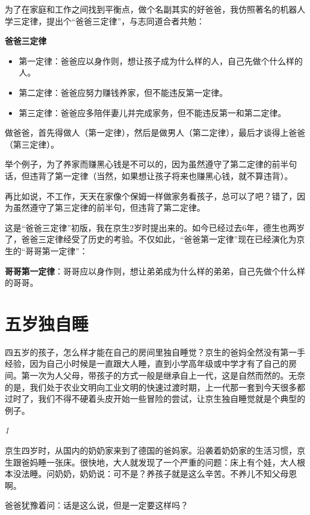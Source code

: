 \documentclass[twoside,openright,headings=optiontohead]{ctexbook} %
\begin{document}
{为了在家庭和工作之间找到平衡点，做个名副其实的好爸爸，我仿照著名的机器人学三定律，提出个``爸爸三定律''，与志同道合者共勉：

\textbf{爸爸三定律}

\begin{itemize}
\item
  第一定律：爸爸应以身作则，想让孩子成为什么样的人，自己先做个什么样的人。
\item
  第二定律：爸爸应努力赚钱养家，但不能违反第一定律。
\item
  第三定律：爸爸应多陪伴妻儿并完成家务，但不能违反第一和第二定律。
\end{itemize}

做爸爸，首先得做人（第一定律），然后是做男人（第二定律），最后才谈得上爸爸（第三定律）。

举个例子，为了养家而赚黑心钱是不可以的，因为虽然遵守了第二定律的前半句话，但违背了第一定律（当然，如果想让孩子将来也赚黑心钱，就不算违背）。

再比如说，不工作，天天在家像个保姆一样做家务看孩子，总可以了吧？错了，因为虽然遵守了第三定律的前半句，但违背了第二定律。

这是``爸爸三定律''初版，我在京生2岁时提出来的。如今已经过去6年，德生也两岁了，爸爸三定律经受了历史的考验。不仅如此，``爸爸第一定律''现在已经演化为京生的``哥哥第一定律''：

\textbf{哥哥第一定律}：哥哥应以身作则，想让弟弟成为什么样的弟弟，自己先做个什么样的哥哥。

\chapter*{五岁独自睡}\label{sleep-alone}

四五岁的孩子，怎么样才能在自己的房间里独自睡觉？京生的爸妈全然没有第一手经验，因为自己小时候是一直跟大人睡，直到小学高年级或中学才有了自己的房
间。第一次为人父母，带孩子的方式一般是继承自上一代，这是自然而然的。无奈的是，我们处于农业文明向工业文明的快速过渡时期，上一代那一套到今天很多都
过时了，我们不得不硬着头皮开始一些冒险的尝试，让京生独自睡觉就是个典型的例子。

\emph{1}

京生四岁时，从国内的奶奶家来到了德国的爸妈家。沿袭着奶奶家的生活习惯，京生跟爸妈睡一张床。很快地，大人就发现了一个严重的问题：床上有个娃，大人根本没法睡。问奶奶，奶奶说：可不是？养孩子就是这么辛苦。不养儿不知父母恩啊。

爸爸犹豫着问：话是这么说，但是一定要这样吗？

}
\end{document}
